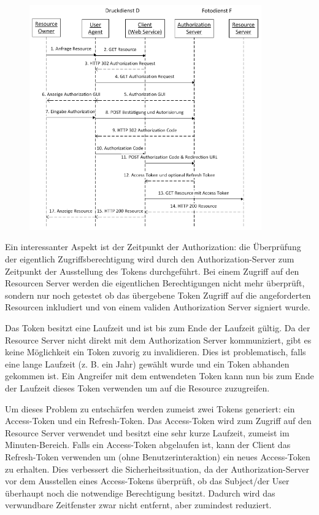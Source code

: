 \begin{figure}[h!]
\includegraphics[width=10cm]{images/oauth_flow.png}
\centering
\end{figure}

Ein interessanter Aspekt ist der Zeitpunkt der Authorization: die Überprüfung der eigentlich Zugriffsberechtigung wird durch den Authorization-Server zum Zeitpunkt der Ausstellung des Tokens durchgeführt. Bei einem Zugriff auf den Resourcen Server werden die eigentlichen Berechtigungen nicht mehr überprüft, sondern nur noch getestet ob das übergebene Token Zugriff auf die angeforderten Resourcen inkludiert und von einem validen Authorization Server signiert wurde.

Das Token besitzt eine Laufzeit und ist bis zum Ende der Laufzeit gültig. Da der Resource Server nicht direkt mit dem Authorization Server kommuniziert, gibt es keine Möglichkeit ein Token zuvorig zu invalidieren. Dies ist problematisch, falls eine lange Laufzeit (z. B. ein Jahr) gewählt wurde und ein Token abhanden gekommen ist. Ein Angreifer mit dem entwendeten Token kann nun bis zum Ende der Laufzeit dieses Token verwenden um auf die Resource zuzugreifen.

Um dieses Problem zu entschärfen werden zumeist zwei Tokens generiert: ein Access-Token und ein Refresh-Token. Das Access-Token wird zum Zugriff auf den Resource Server verwendet und besitzt eine sehr kurze Laufzeit, zumeist im Minuten-Bereich. Falls ein Access-Token abgelaufen ist, kann der Client das Refresh-Token verwenden um (ohne Benutzerinteraktion) ein neues Access-Token zu erhalten. Dies verbessert die Sicherheitssituation, da der Authorization-Server vor dem Ausstellen eines Access-Tokens überprüft, ob das Subject/der User überhaupt noch die notwendige Berechtigung besitzt. Dadurch wird das verwundbare Zeitfenster zwar nicht entfernt, aber zumindest reduziert.

